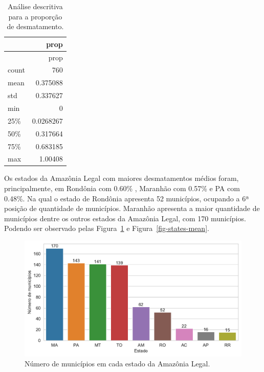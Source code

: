 \documentclass[
]{article}
\begin{document}
\hypertarget{tbl-descritiva}{}
\begin{longtable}[]{@{}lr@{}}
\caption{\label{tbl-descritiva}Análise descritiva para a proporção de
desmatamento.}\tabularnewline
\toprule()
& prop \\
\midrule()
\endfirsthead
\toprule()
& prop \\
\midrule()
\endhead
count & 760 \\
mean & 0.375088 \\
std & 0.337627 \\
min & 0 \\
25\% & 0.0268267 \\
50\% & 0.317664 \\
75\% & 0.683185 \\
max & 1.00408 \\
\bottomrule()
\end{longtable}

Os estados da Amazônia Legal com maiores desmatamentos médios foram,
principalmente, em Rondônia com 0.60\% , Maranhão com 0.57\% e PA com
0.48\%. Na qual o estado de Rondônia apresenta 52 municípios, ocupando a
6ª posição de quantidade de municípios. Maranhão apresenta a maior
quantidade de municípios dentre os outros estados da Amazônia Legal, com
170 municípios. Podendo ser observado pelas Figura~\ref{fig-num-city} e
Figura~\ref{fig-states-mean}.

\begin{figure}[H]

{\centering \includegraphics{report_files/figure-pdf/fig-num-city-output-1.pdf}

}

\caption{\label{fig-num-city}Número de municípios em cada estado da
Amazônia Legal.}

\end{figure}
\end{document}
